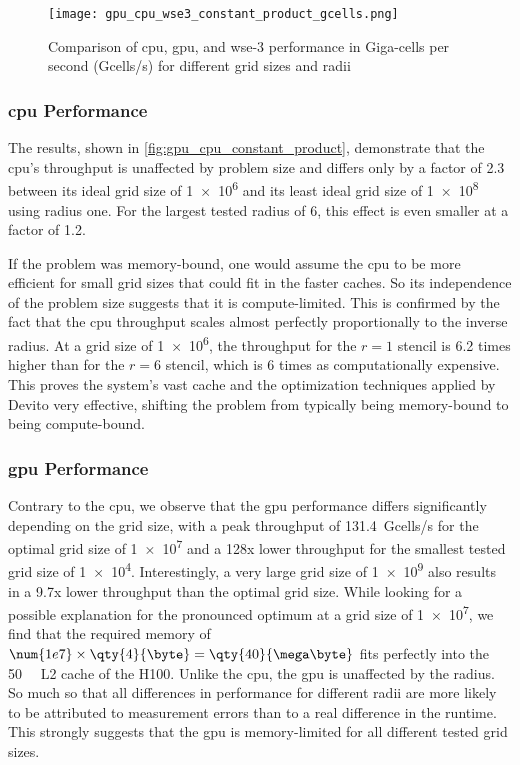 \begin{figure}[h]
    \centering
    \texttt{[image: gpu\_cpu\_wse3\_constant\_product\_gcells.png]}
    \caption{Comparison of \ac{cpu}, \ac{gpu}, and \ac{wse}-3 performance in Giga-cells per second (Gcells/s) for different grid sizes and radii}
    \label{fig:gpu_cpu_constant_product}
\end{figure}

\subsubsection{\ac{cpu} Performance}
The results, shown in \autoref{fig:gpu_cpu_constant_product}, demonstrate that the \ac{cpu}'s throughput is unaffected by problem size and differs only by a factor of \num{2.3} between its ideal grid size of \num{1e6} and its least ideal grid size of \num{1e8} using radius one. For the largest tested radius of \num{6}, this effect is even smaller at a factor of \num{1.2}.

If the problem was memory-bound, one would assume the \ac{cpu} to be more efficient for small grid sizes that could fit in the faster caches. So its independence of the problem size suggests that it is compute-limited.
This is confirmed by the fact that the \ac{cpu} throughput scales almost perfectly proportionally to the inverse radius.
At a grid size of \num{1e6}, the throughput for the $r=1$ stencil is \num{6.2} times higher than for the $r=6$ stencil, which is \num{6} times as computationally expensive. This proves the system's vast cache and the optimization techniques applied by Devito very effective, shifting the problem from typically being memory-bound to being compute-bound. 

\subsubsection{\ac{gpu} Performance}
Contrary to the \ac{cpu}, we observe that the \ac{gpu} performance differs significantly depending on the grid size, with a peak throughput of \qty{131.4}{Gcells/s} for the optimal grid size of \num{1e7} and a 128x lower throughput for the smallest tested grid size of \num{1e4}. Interestingly, a very large grid size of \num{1e9} also results in a 9.7x lower throughput than the optimal grid size. While looking for a possible explanation for the pronounced optimum at a grid size of \num{1e7}, we find that the required memory of $\num{1e7} \times \qty{4}{\byte} = \qty{40}{\mega\byte}$ fits perfectly into the \qty{50}{\mega\byte} L2 cache of the H100.
Unlike the \ac{cpu}, the \ac{gpu} is unaffected by the radius. So much so that all differences in performance for different radii are more likely to be attributed to measurement errors than to a real difference in the runtime. This strongly suggests that the \ac{gpu} is memory-limited for all different tested grid sizes.

